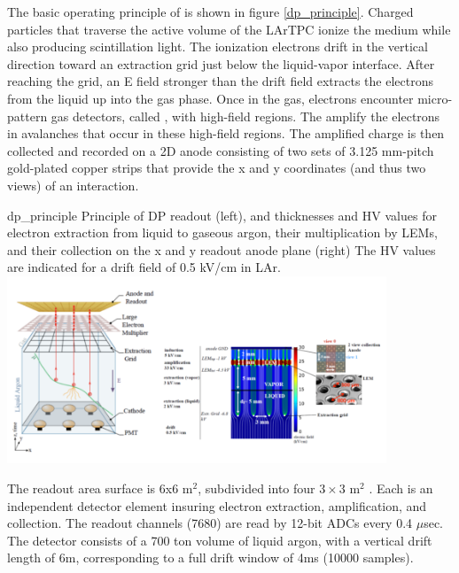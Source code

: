 \documentclass[../main-v1.tex]{subfiles}
\begin{document}
The basic operating principle of  is shown in figure \ref{dp_principle}. Charged particles that traverse the active volume of the LArTPC ionize the medium while also producing scintillation
light. The ionization electrons drift in the vertical direction toward an extraction grid just below the liquid-vapor interface. 
After reaching the grid,
an E field stronger than the drift field extracts the electrons from the liquid up into the gas phase.
Once in the gas, electrons encounter micro-pattern gas detectors, called , with high-field regions. The  amplify the electrons in avalanches that occur in these
high-field regions. The amplified charge is then collected and recorded on a 2D anode consisting
of two sets of 3.125 mm-pitch gold-plated copper strips that provide the x and y coordinates (and
thus two views) of an interaction.   

\begin{dunefigure}
{dp_principle} %
{Principle of DP readout (left), and thicknesses and HV values for electron extraction from liquid to gaseous argon, their
multiplication by LEMs, and their collection on the x and y readout anode plane (right) The HV values are
indicated for a drift field of 0.5 kV/cm in LAr.}
\includegraphics[width=0.85\textwidth]{graphics/IntroFigures/Fig_11_protodune-dp-principle.png}
\end{dunefigure}

The readout area surface is 6x6 m$^2$, subdivided into four $3\times3$ m$^2$  . Each  is an independent detector element insuring electron extraction, amplification, and collection. 
The readout channels (7680)  are read by   12-bit ADCs every 0.4 $\mu$sec. 
The  detector   consists of a 700 ton volume of liquid argon, with  a vertical drift length of 6m, corresponding to a full drift window of 4ms (10000 samples).
\end{document}
